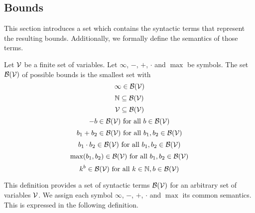 \subsection{Bounds}

This section introduces a set which contains the syntactic terms that represent the resulting bounds.
Additionally, we formally define the semantics of those terms.

\begin{definition}
  Let $\mathcal{V}$ be a finite set of variables.
  Let $\infty$, $-$, $+$, $\cdot$ and $\max$ be symbols.
  The set $\mathcal{B}(\mathcal{V})$ of possible bounds is the smallest set with
  \[ \infty \in \mathcal{B}(\mathcal{V}) \]
  \[ \mathbb{N} \subseteq \mathcal{B}(\mathcal{V}) \] 
  \[ \mathcal{V} \subseteq \mathcal{B}(\mathcal{V}) \] 
  \[ -b \in \mathcal{B}(\mathcal{V}) \text{ for all } b \in \mathcal{B}(\mathcal{V}) \] 
  \[ b_1 + b_2 \in \mathcal{B}(\mathcal{V}) \text{ for all } b_1, b_2 \in \mathcal{B}(\mathcal{V}) \] 
  \[ b_1 \cdot b_2 \in \mathcal{B}(\mathcal{V}) \text{ for all } b_1, b_2 \in \mathcal{B}(\mathcal{V}) \] 
  \[ \max(b_1, b_2) \in \mathcal{B}(\mathcal{V}) \text{ for all } b_1, b_2 \in \mathcal{B}(\mathcal{V}) \]
  \[ k^b \in \mathcal{B}(\mathcal{V}) \text{ for all } k \in \mathbb{N}, b \in \mathcal{B}(\mathcal{V}) \]
\end{definition}
This definition provides a set of syntactic terms $\mathcal{B}(\mathcal{V})$ for an arbitrary set of variables $\mathcal{V}$.
We assign each symbol $\infty$, $-$, $+$, $\cdot$ and $\max$ its common semantics.
This is expressed in the following definition.

